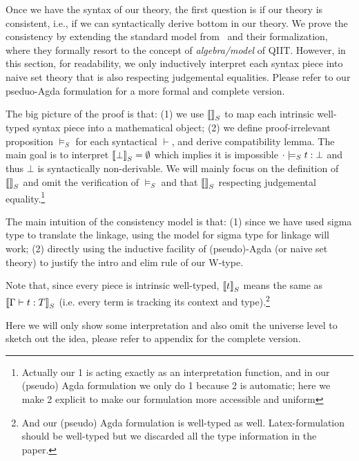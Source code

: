 

Once we have the syntax of our theory, the first question is if our theory is consistent, i.e., if we can syntactically derive bottom in our theory. We prove the consistency by extending the standard model from~\cite{altkap2016,kaposi2017type, kaposi2019gluing} and their formalization, where they formally resort to the concept of \textit{algebra/model} of QIIT. However, in this section, for readability, we only inductively interpret each syntax piece into naive set theory that is also respecting judgemental equalities. Please refer to our pseduo-Agda formulation for a more formal and complete version.

The big picture of the proof is that: (1) we use ${\llbracket {} \rrbracket}_S$ to map each intrinsic well-typed syntax piece into a mathematical object; (2) we define proof-irrelevant proposition $\models_S$ for each syntactical $\vdash$, and derive compatibility lemma. The main goal is to interpret ${\llbracket {\bot} \rrbracket}_S = \emptyset$ which implies it is impossible ${ {\cdot} \models_S {t} : {\bot} }$ and thus $\bot$ is syntactically non-derivable. We will mainly focus on the definition of ${\llbracket {} \rrbracket}_S$ and omit the verification of $\models_S$ and that ${\llbracket {} \rrbracket}_S$ respecting judgemental equality.\footnote{Actually our 1 is acting exactly as an interpretation function, and in our (pseudo) Agda formulation we only do 1 because 2 is automatic; here we make 2 explicit to make our formulation more accessible and uniform}


The main intuition of the consistency model is that: (1) since we have used sigma type to translate the linkage, using the model for sigma type for linkage will work; (2) directly using the inductive facility of (pseudo)-Agda (or naive set theory) to justify the intro and elim rule of our W-type.

Note that, since every piece is intrinsic well-typed, ${\llbracket {t} \rrbracket}_S$ means the same as ${\llbracket {\ensuremath{ {\Gamma} \vdash {t} : {T} }} \rrbracket}_S$ (i.e. every term is tracking its context and type).\footnote{And our (pseudo) Agda formulation is well-typed as well. Latex-formulation should be well-typed but we discarded all the type information in the paper.}

Here we will only show some interpretation and also omit the universe level to sketch out the idea, please refer to appendix for the complete version. 



